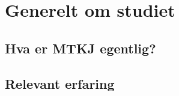 \usepackage{lipsum}
\usepackage{longtable}
\usepackage{float}
\usepackage[most]{tcolorbox}

\newcommand\ytl[2]{
\parbox[b]{8em}{\hfill{\color{cyan}\bfseries\sffamily #1}~$\cdots\cdots$~}\makebox[0pt][c]{$\bullet$}\vrule\quad \parbox[c]{6cm}{\vspace{7pt}\color{red!40!black!80}\raggedright\sffamily #2\\[7pt]}\\[-3pt]}

\usepackage[scaled]{helvet}
\usepackage[T1]{fontenc}
\usepackage{cmbright} %


\renewcommand{\tablename}{Tabell}
\renewcommand{\figurename}{Figur}

\coverpage{\TITLE}{\SUBTITLE}{\AUTHOR}{\DATE}{\SUBJECT}
\newpage


\newpage
\tableofcontents

\part{Generelt om studiet}
\newpage
\chapter{Hva er MTKJ egentlig?} \label{ch:MTKJ}


\newpage
\chapter{Relevant erfaring} \label{ch:relevant_erfaring}


\newpage
